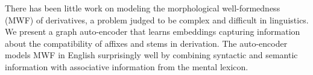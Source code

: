 There has been little work on modeling the morphological well-formedness (MWF) of derivatives, a problem judged to be complex and difficult in linguistics. We present a graph auto-encoder that learns embeddings capturing information about the compatibility of affixes and stems in derivation. The auto-encoder models MWF in English surprisingly well by combining syntactic and semantic information with associative information from the mental lexicon.
